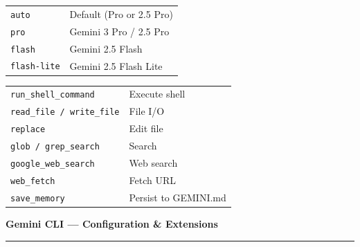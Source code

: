 \documentclass[9pt]{extarticle}
\newcommand{\cardtitle}[1]{%
  {\Large\bfseries #1}\par\vspace{1pt}%
  \rule{\linewidth}{0.4pt}\par\vspace{4pt}%
}
\newcommand{\sect}[1]{\needspace{4\baselineskip}\vspace{6pt}{\footnotesize\bfseries\scshape #1}\par\vspace{2pt}}
\begin{document}
\begin{multicols}{3}
\sect{Model Aliases}
\begin{tabularx}{\linewidth}{@{}l@{\enspace}Y@{}}
\texttt{auto}                        & Default (Pro or 2.5 Pro) \\
\texttt{pro}                         & Gemini 3 Pro / 2.5 Pro \\
\texttt{flash}                       & Gemini 2.5 Flash \\
\texttt{flash-lite}                  & Gemini 2.5 Flash Lite \\
\end{tabularx}

\sect{Built-in Tools}
\begin{tabularx}{\linewidth}{@{}l@{\enspace}Y@{}}
\texttt{run\_shell\_command}        & Execute shell \\
\texttt{read\_file / write\_file}   & File I/O \\
\texttt{replace}                     & Edit file \\
\texttt{glob / grep\_search}        & Search \\
\texttt{google\_web\_search}        & Web search \\
\texttt{web\_fetch}                  & Fetch URL \\
\texttt{save\_memory}               & Persist to GEMINI.md \\
\end{tabularx}

\end{multicols}

\newpage

\cardtitle{Gemini CLI --- Configuration \& Extensions}
\end{document}
